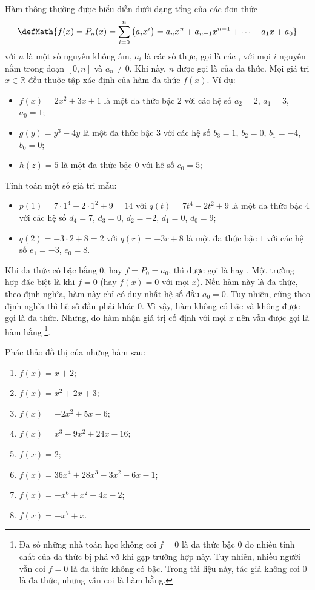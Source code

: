 Hàm  thông thường được biểu diễn dưới dạng tổng của các đơn thức $$\defMath{f(x)=P_n(x)=\sum_{i = 0}^n \left(a_i x^i\right) = a_nx^n + a_{n-1}x^{n-1} + \cdots + a_1x + a_0}$$ với $n$ là một số nguyên không âm, $a_i$ là các số thực, gọi là các , với mọi $i$ nguyên nằm trong đoạn $[0, n]$ và $a_n \neq 0$. Khi này, $n$ được gọi là  của đa thức\label{def:ham_so_mot_bien:da_thuc:da_thuc}. Mọi giá trị $x \in \mathbb{R}$ đều thuộc tập xác định của hàm đa thức $f(x)$. Ví dụ:
\begin{itemize}
   \item $f(x) = 2x^2 + 3x + 1$ là một đa thức bậc $2$ với các hệ số $a_2 = 2$, $a_1 = 3$, $a_0 = 1$;
   \item $g(y) = y^3 - 4y$ là một đa thức bậc $3$ với các hệ số $b_3 = 1$, $b_2 = 0$, $b_1 = -4$, $b_0 = 0$;
   \item $h(z) = 5$ là một đa thức bậc $0$ với hệ số $c_0 = 5$;
\end{itemize}
Tính toán một số giá trị mẫu:
\begin{itemize}
   \item $p(1) = 7 \cdot 1^4 - 2 \cdot 1^2 + 9 = 14$ với $q(t)= 7t^4 - 2t^2 + 9$ là một đa thức bậc $4$ với các hệ số $d_4 = 7$, $d_3 = 0$, $d_2 = -2$, $d_1 = 0$, $d_0 = 9$;
   \item $q(2) = -3 \cdot 2 + 8 = 2$ với $q(r) = -3r + 8$ là một đa thức bậc $1$ với các hệ số $e_1 = -3$, $e_0 = 8$.
\end{itemize}
Khi đa thức có bậc bằng $0$, hay $f = P_0 = a_0$, thì được gọi là  hay . Một trường hợp đặc biệt là khi $f = 0$ (hay $f(x) = 0$ với mọi $x$). Nếu hàm này là đa thức, theo định nghĩa, hàm này chỉ có duy nhất hệ số đầu $a_0 = 0$. Tuy nhiên, cũng theo định nghĩa thì hệ số đầu phải khác $0$. Vì vậy, hàm không có bậc và không được gọi là đa thức. Nhưng, do hàm nhận giá trị cố định với mọi $x$ nên vẫn được gọi là hàm hằng \footnote{Đa số những nhà toán học không coi $f = 0$ là đa thức bậc $0$ do nhiều tính chất của đa thức bị phá vỡ khi gặp trường hợp này. Tuy nhiên, nhiều người vẫn coi $f = 0$ là đa thức không có bậc. Trong tài liệu này, tác giả không coi $0$ là đa thức, nhưng vẫn coi là hàm hằng.}.

\exercise Phác thảo đồ thị của những hàm sau:
\begin{multicols}{2}
   \begin{enumerate}
      \item $f(x) = x + 2$; 
      \item $f(x) = x^2 + 2x + 3$;
      \item $f(x) = -2x^2 + 5x - 6$;
      \item $f(x) = x^3 - 9x^2 + 24x - 16$;
      \item $f(x) = 2$;
      \item $f(x) = 36x^4 + 28x^3 - 3x^2 - 6x - 1$;
      \item $f(x) = -x^6 + x^2 - 4x - 2$;
      \item $f(x) = -x^7 + x$.
   \end{enumerate}
\end{multicols}

